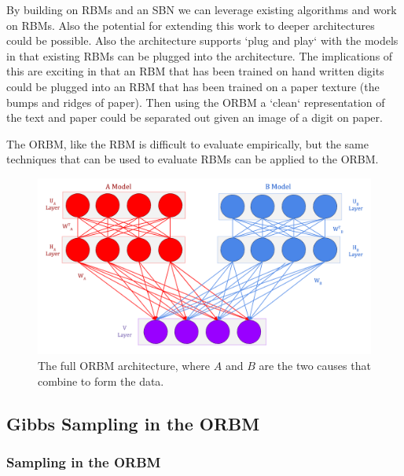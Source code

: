 By building on RBMs and an SBN we can leverage existing algorithms and work on RBMs. Also the potential for extending this work to deeper architectures could be possible. Also the architecture supports `plug and play` with the models in that existing RBMs can be plugged into the architecture. The implications of this are exciting in that an RBM that has been trained on hand written digits could be plugged into an RBM that has been trained on a paper texture (the bumps and ridges of paper). Then using the ORBM a `clean` representation of the text and paper could be separated out given an image of a digit on paper.

The ORBM, like the RBM is difficult to evaluate empirically, but the same techniques that can be used to evaluate RBMs can be applied to the ORBM.\@

\begin{figure}[h]
\begin{center}
  \includegraphics[width = 1.2\textwidth]{Assets/ORBM-Full-Architecture.png}
\caption{The full ORBM architecture, where $A$ and $B$ are the two causes that combine to form the data.}
\label{ORBM-Architecture}
\end{center}
\end{figure}

\subsection{Gibbs Sampling in the ORBM}

\subsubsection{Sampling in the ORBM}

